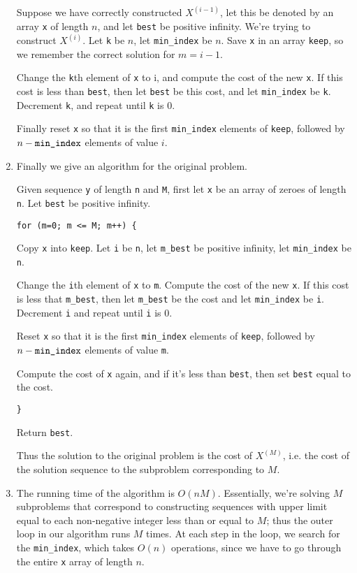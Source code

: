 \documentclass[11pt]{article}
\begin{document}
\begin{enumerate}
Suppose we have correctly constructed $X^{(i-1)}$, let this be denoted by an array \verb|x| of length $n$, and let \verb|best| be positive infinity. We're trying to construct $X^{(i)}$. Let \verb|k| be $n$, let \verb|min_index| be $n$. Save \verb|x| in an array \verb|keep|, so we remember the correct solution for $m=i-1$. 

Change the \verb|k|th element of \verb|x| to i, and compute the cost of the new \verb|x|. If this cost is less than \verb|best|, then let \verb|best| be this cost, and let \verb|min_index| be \verb|k|. Decrement \verb|k|, and repeat until \verb|k| is 0. 

Finally reset \verb|x| so that it is the first \verb|min_index| elements of \verb|keep|, followed by $n-\verb|min_index|$ elements of value $i$. 

\item Finally we give an algorithm for the original problem.

Given sequence \verb|y| of length \verb|n| and \verb|M|, first let \verb|x| be an array of zeroes of length \verb|n|. Let \verb|best| be positive infinity. 

\verb|for (m=0; m <= M; m++) {|

\quad Copy \verb|x| into \verb|keep|. Let \verb|i| be \verb|n|, let \verb|m_best| be positive infinity, let \verb|min_index| be \verb|n|. 

\quad Change the \verb|i|th element of \verb|x| to \verb|m|. Compute the cost of the new \verb|x|. If this cost is less that \verb|m_best|, then let \verb|m_best| be the cost and let \verb|min_index| be \verb|i|. Decrement \verb|i| and repeat until \verb|i| is 0. 

\quad Reset \verb|x| so that it is the first \verb|min_index| elements of \verb|keep|, followed by $n-\verb|min_index|$ elements of value \verb|m|. 

\quad Compute the cost of \verb|x| again, and if it's less than \verb|best|, then set \verb|best| equal to the cost. 

\verb|}|

Return \verb|best|.

Thus the solution to the original problem is the cost of $X^{(M)}$, i.e. the cost of the solution sequence to the subproblem corresponding to $M$. 

\item The running time of the algorithm is $O(nM)$. Essentially, we're solving $M$ subproblems that correspond to constructing sequences with upper limit equal to each non-negative integer less than or equal to $M$; thus the outer loop in our algorithm runs $M$ times. At each step in the loop, we search for the \verb|min_index|, which takes $O(n)$ operations, since we have to go through the entire \verb|x| array of length $n$. 
\end{enumerate}
\end{document}
